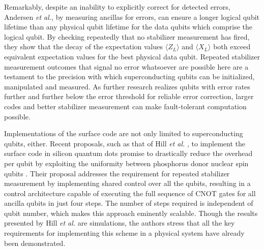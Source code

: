Remarkably, despite an inability to explicitly correct for detected errors,
Andersen \textit{et al.}, by measuring ancillas for errors, can ensure a longer
logical qubit lifetime than any physical qubit lifetime for the data qubits
which comprise the logical qubit. By checking repeatedly that no stabilizer
measurement has fired, they show that the decay of the expectation values
$\langle Z_L \rangle$ and $\langle X_L \rangle$ both exceed equivalent
expectation values for the best physical data qubit. Repeated stabilizer
measurement outcomes that signal no error whatsoever are possible here are a
testament to the precision with which superconducting qubits can be initialized,
manipulated and measured. As further research realizes qubits with error rates
further and further below the error threshold for reliable error correction,
larger codes and better stabilizer measurement can make fault-tolerant
computation possible.

Implementations of the surface code are not only limited to superconducting
qubits, either. Recent proposals, such as that of Hill \textit{et al.} , to
implement the surface code in silicon quantum dots promise to drastically reduce
the overhead per qubit by exploiting the uniformity between phosphorus donor
nuclear spin qubits \cite{silicon_surface_code}. Their proposal addresses the
requirement for repeated stabilizer measurement by implementing shared control
over all the qubits, resulting in a control architecture capable of executing
the full sequence of CNOT gates for all ancilla qubits in just four steps. The
number of steps required is independent of qubit number, which makes this
approach eminently scalable. Though the results presented by Hill \textit{et
  al.} are simulations, the authors stress that all the key requirements for
implementing this scheme in a physical system have already been demonstrated.


